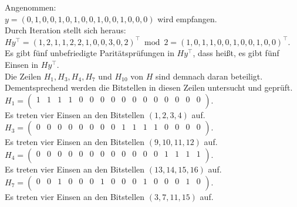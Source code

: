 \begin{Beispiel}
    Angenommen:\\
    $y = (0,1,0,0,1,0,1,0,0,1,0,0,1,0,0,0)$ wird empfangen.\\
    
    Durch Iteration stellt sich heraus:\\
    $Hy^\intercal = (1,2,1,1,2,2,1,0,0,3,0,2)^\intercal \bmod 2 = (1,0,1,1,0,0,1,0,0,1,0,0)^\intercal$.\\
    
    Es gibt fünf unbefriedigte Paritätsprüfungen in $Hy^\intercal$, dass hei\ss{}t, es gibt fünf Einsen in $Hy^\intercal.$\\
    Die Zeilen $H_1, H_3, H_4, H_7$ und $H_{10}$ von $H$ sind demnach daran beteiligt.\\ 
    Dementsprechend werden die Bitstellen in diesen Zeilen untersucht und geprüft.\\
    
    $H_1= \left( \begin{array}{rrrrrrrrrrrrrrrr}
        1 & 1 & 1 & 1 & 0 & 0 & 0 & 0 & 0 & 0 & 0 & 0 & 0 & 0 & 0 & 0 \\
       \end{array}\right). 
    $\\
    Es treten vier Einsen an den Bitstellen $(1, 2, 3, 4)$ auf.\\
    
    $H_3= \left( \begin{array}{rrrrrrrrrrrrrrrr}
        0 & 0 & 0 & 0 & 0 & 0 & 0 & 0 & 1 & 1 & 1 & 1 & 0 & 0 & 0 & 0 \\
       \end{array}\right). 
    $\\
    Es treten vier Einsen an den Bitstellen $(9, 10, 11, 12)$ auf.\\
    
    $H_4= \left( \begin{array}{rrrrrrrrrrrrrrrr}
        0 & 0 & 0 & 0 & 0 & 0 & 0 & 0 & 0 & 0 & 0 & 0 & 1 & 1 & 1 & 1 \\
       \end{array}\right). 
    $\\
    Es treten vier Einsen an den Bitstellen $(13, 14, 15, 16)$ auf.\\
    
    $H_7= \left( \begin{array}{rrrrrrrrrrrrrrrr}
        0 & 0 & 1 & 0 & 0 & 0 & 1 & 0 & 0 & 0 & 1 & 0 & 0 & 0 & 1 & 0 \\
       \end{array}\right). 
    $\\
    Es treten vier Einsen an den Bitstellen $(3, 7, 11, 15)$ auf.\\
    

\end{Beispiel}
